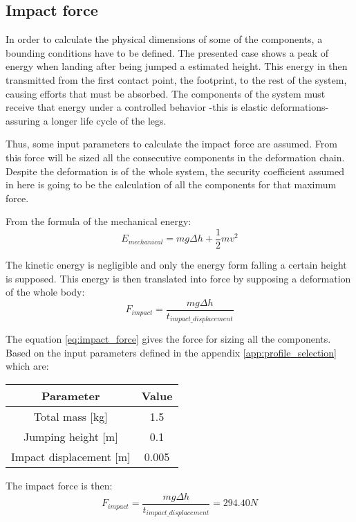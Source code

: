 \subsection{Impact force} %
\label{sub:impact_force}
In order to calculate the physical dimensions of some of the components, a bounding conditions have to be defined.
The presented case shows a peak of energy when landing after being jumped a estimated height.
This energy in then transmitted from the first contact point, the footprint, to the rest of the system, causing efforts that must be absorbed.
The components of the system must receive that energy under a controlled behavior -this is elastic deformations- assuring a longer life cycle of the legs.

Thus, some input parameters to calculate the impact force are assumed.
From this force will be sized all the consecutive components in the deformation chain.
Despite the deformation is of the whole system, the security coefficient assumed in here is going to be the calculation of all the components for that maximum force.

From the formula of the mechanical energy:
\begin{equation}
  E_{mechanical} = m g \Delta h + \frac{1}{2} m v^{2}
\end{equation}

The kinetic energy is negligible and only the energy form falling a certain height is supposed.
This energy is then translated into force by supposing a deformation of the whole body:
\begin{equation}
\label{eq:impact_force}
  F_{impact} = \frac{m g \Delta h}{t_{impact\_displacement}}
\end{equation}

The equation \ref{eq:impact_force} gives the force for sizing all the components.
Based on the input parameters defined in the appendix \ref{app:profile_selection} which are:
\begin{center}
\begin{tabular}{c | c}
  Parameter & Value \\
  \hline
  Total mass [kg] & 1.5 \\
  Jumping height [m] & 0.1 \\
  Impact displacement [m] & 0.005
\end{tabular}
\end{center}

The impact force is then:
\begin{equation}
  F_{impact} = \frac{m g \Delta h}{t_{impact\_displacement}} = 294.40 N 
\end{equation}
